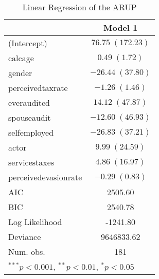 
\begin{table}
\begin{tabular}{l c }
\hline
 & Model 1 \\
\hline
(Intercept)          & $76.75 \; (172.23)$ \\
calcage              & $0.49 \; (1.72)$    \\
gender               & $-26.44 \; (37.80)$ \\
perceivedtaxrate     & $-1.26 \; (1.46)$   \\
everaudited          & $14.12 \; (47.87)$  \\
spouseaudit          & $-12.60 \; (46.93)$ \\
selfemployed         & $-26.83 \; (37.21)$ \\
actor                & $9.99 \; (24.59)$   \\
servicestaxes        & $4.86 \; (16.97)$   \\
perceivedevasionrate & $-0.29 \; (0.83)$   \\
\hline
AIC                  & 2505.60             \\
BIC                  & 2540.78             \\
Log Likelihood       & -1241.80            \\
Deviance             & 9646833.62          \\
Num. obs.            & 181                 \\
\hline
\multicolumn{2}{l}{\scriptsize{$^{***}p<0.001$, $^{**}p<0.01$, $^*p<0.05$}}
\end{tabular}
\caption{Linear Regression of the ARUP}
\label{table:coefficients}
\end{table}
